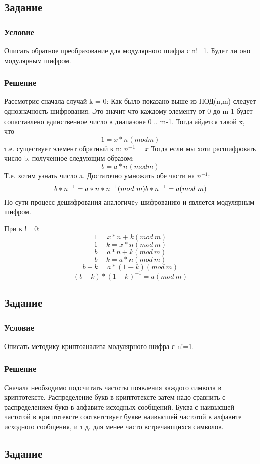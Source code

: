 \documentclass[10pt,a4paper]{article}
\begin{document}
\subsection*{Задание}
\subsubsection*{Условие}
Описать обратное преобразование для модулярного шифра с n!=1. Будет ли оно модулярным шифром. 
\subsubsection*{Решение}
Рассмотрис сначала случай k = 0:
Как было показано выше из НОД(n,m) следует однозначность
шифрования. Это значит что каждому элементу от 0 до m-1 будет
сопаставлено единственное число в диапазоне 0 .. m-1.
Тогда айдется такой x, что
$$1 = x*n (mod m)$$
т.е. существует элемент обратный к n: $n^{-1} = x$
Тогда если мы хоти расшифровать число b, полученное следующим образом:
$$b = a*n (mod m)$$
Т.е. хотим узнать число a. Достаточно умножить обе части на $n^{-1}$:
$$ b*n^{-1} = a*n*n^{-1} (mod\ m) \\
   b*n^{-1} = a (mod\ m) $$
По сути процесс дешифрования аналогичеy шифрованию и является
модулярным шифром.

При к != 0:
$$ 1 = x*n + k (mod\ m) $$
$$ 1 - k = x*n (mod\ m) $$
$$ b = a*n + k (mod\ m) $$
$$ b - k = a*n (mod\ m) $$
$$ b - k = a*(1 - k) (mod\ m) $$
$$ (b - k)*(1 - k)^{-1} = a (mod\ m) $$

\subsection*{Задание}
\subsubsection*{Условие}
Описать методику криптоанализа модулярного шифра с n!=1.
\subsubsection*{Решение}
Сначала необходимо подсчитать частоты появления каждого символа в
криптотексте. Распределение букв в криптотексте затем надо сравнить с
распределением букв в алфавите исходных сообщений. Буква с наивысшей частотой в
криптотексте соответствует букве наивысшей частотой в алфавите
исходного сообщения, и т.д. для менее часто встречающихся символов.

\subsection*{Задание}
\end{document}
